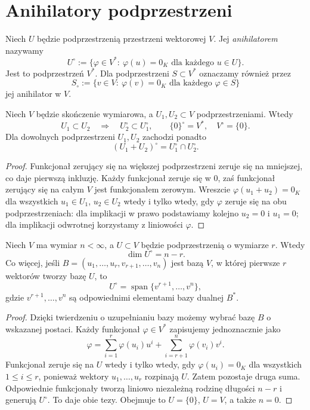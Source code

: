 \section{Anihilatory podprzestrzeni}
\label{sec:lin7-anihilatory}

\begin{definicja}[Anihilator]
\label{def:lin7-anihilator}
Niech \(U\) będzie podprzestrzenią
przestrzeni wektorowej \(V\).
Jej \emph{anihilatorem} nazywamy
\[
 U^\circ:=
 \{\varphi\in V^*:\ \varphi(u)=0_K
                 \text{ dla każdego }u\in U\}.
\]
Jest to podprzestrzeń \(V^*\).
Dla podprzestrzeni \(S\subset V^*\)
oznaczamy również przez
\[
 S_\circ:=
 \{v\in V:\ \varphi(v)=0_K
                   \text{ dla każdego }\varphi\in S\}
\]
jej anihilator w \(V\).
\end{definicja}

\begin{stwierdzenie}
\label{prop:lin7-anihilator-wlasnosci}
Niech \(V\) będzie skończenie wymiarowa,
a \(U_1,U_2\subset V\) podprzestrzeniami.
Wtedy
\[
 U_1\subset U_2
 \quad\Longrightarrow\quad
 U_2^\circ\subset U_1^\circ,
 \qquad
 \{0\}^\circ=V^*,\quad
 V^\circ=\{0\}.
\]
Dla dowolnych podprzestrzeni \(U_1,U_2\)
zachodzi ponadto
\[
 (U_1+U_2)^\circ=U_1^\circ\cap U_2^\circ.
\]
\end{stwierdzenie}
\begin{proof}
Funkcjonał zerujący się na większej
podprzestrzeni zeruje się na mniejszej,
co daje pierwszą inkluzję.
Każdy funkcjonał zeruje się w \(0\),
zaś funkcjonał zerujący się na całym
\(V\) jest funkcjonałem zerowym.
Wreszcie
\(\varphi(u_1+u_2)=0_K\)
dla wszystkich \(u_1\in U_1\),
\(u_2\in U_2\) wtedy i tylko wtedy,
gdy \(\varphi\) zeruje się na obu
podprzestrzeniach: dla implikacji
w prawo podstawiamy kolejno
\(u_2=0\) i \(u_1=0\);
dla implikacji odwrotnej korzystamy
z liniowości \(\varphi\).
\end{proof}

\begin{twierdzenie}
\label{thm:lin7-wymiar-anihilatora}
Niech \(V\) ma wymiar \(n<\infty\),
a \(U\subset V\) będzie
podprzestrzenią o wymiarze \(r\).
Wtedy
\[
 \dim U^\circ=n-r.
\]
Co więcej, jeśli
\(B=(u_1,\ldots,u_r,v_{r+1},\ldots,v_n)\)
jest bazą \(V\), w której pierwsze
\(r\) wektorów tworzy bazę \(U\),
to
\[
 U^\circ=
 \operatorname{span}\{v^{r+1},\ldots,v^n\},
\]
gdzie \(v^{r+1},\ldots,v^n\)
są odpowiednimi elementami
bazy dualnej \(B^*\).
\end{twierdzenie}
\begin{proof}
Dzięki twierdzeniu o uzupełnianiu
bazy możemy wybrać bazę \(B\)
o wskazanej postaci. Każdy funkcjonał
\(\varphi\in V^*\) zapisujemy
jednoznacznie jako
\[
 \varphi=\sum_{i=1}^{r}
          \varphi(u_i)u^i
        +\sum_{i=r+1}^{n}
          \varphi(v_i)v^i.
\]
Funkcjonał zeruje się na \(U\)
wtedy i tylko wtedy, gdy
\(\varphi(u_i)=0_K\) dla wszystkich
\(1\leq i\leq r\), ponieważ wektory
\(u_1,\ldots,u_r\) rozpinają \(U\).
Zatem pozostaje druga suma.
Odpowiednie funkcjonały tworzą
liniowo niezależną rodzinę
długości \(n-r\) i generują
\(U^\circ\). To daje obie tezy.
Obejmuje to \(U=\{0\}\),
\(U=V\), a także \(n=0\).
\end{proof}

